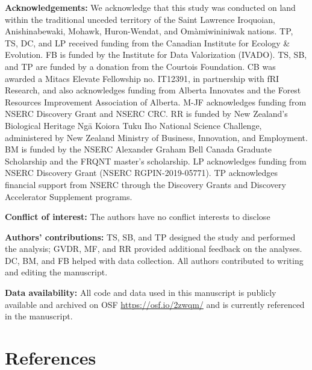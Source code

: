 \documentclass[10pt,oneside]{article}
\begin{document}
\textbf{Acknowledgements:} We acknowledge that this study was conducted
on land within the traditional unceded territory of the Saint Lawrence
Iroquoian, Anishinabewaki, Mohawk, Huron-Wendat, and Omàmiwininiwak
nations. TP, TS, DC, and LP received funding from the Canadian Institute
for Ecology \& Evolution. FB is funded by the Institute for Data
Valorization (IVADO). TS, SB, and TP are funded by a donation from the
Courtois Foundation. CB was awarded a Mitacs Elevate Fellowship no.
IT12391, in partnership with fRI Research, and also acknowledges funding
from Alberta Innovates and the Forest Resources Improvement Association
of Alberta. M-JF acknowledges funding from NSERC Discovery Grant and
NSERC CRC. RR is funded by New Zealand's Biological Heritage Ngā Koiora
Tuku Iho National Science Challenge, administered by New Zealand
Ministry of Business, Innovation, and Employment. BM is funded by the
NSERC Alexander Graham Bell Canada Graduate Scholarship and the FRQNT
master's scholarship. LP acknowledges funding from NSERC Discovery Grant
(NSERC RGPIN-2019-05771). TP acknowledges financial support from NSERC
through the Discovery Grants and Discovery Accelerator Supplement
programs.

\textbf{Conflict of interest:} The authors have no conflict interests to
disclose

\textbf{Authors' contributions:} TS, SB, and TP designed the study and
performed the analysis; GVDR, MF, and RR provided additional feedback on
the analyses. DC, BM, and FB helped with data collection. All authors
contributed to writing and editing the manuscript.

\textbf{Data availability:} All code and data used in this manuscript is
publicly available and archived on OSF \url{https://osf.io/2zwqm/} and
is currently referenced in the manuscript.

\hypertarget{references}{%
\section*{References}\label{references}}
\end{document}
